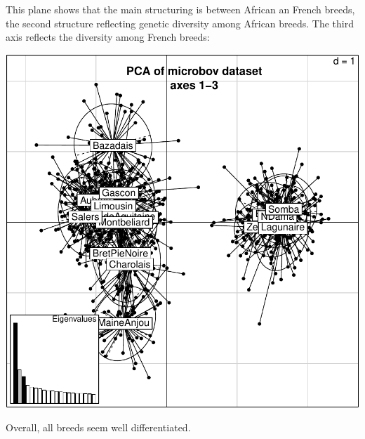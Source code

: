 \documentclass{article}
\begin{document}
\noindent This plane shows that the main structuring is between African an French breeds, the second structure reflecting genetic diversity among African breeds.
The third axis reflects the diversity among French breeds:
\begin{Schunk}
\end{Schunk}
\includegraphics{figs/base-072}

\noindent Overall, all breeds seem well differentiated.
~\\
\end{document}
